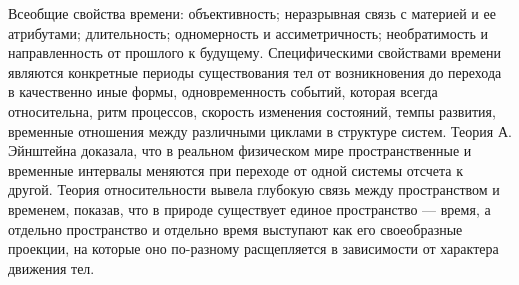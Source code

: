 \documentclass[12pt]{article}
\begin{document}
Всеобщие свойства времени: объективность; неразрывная связь с материей и ее атрибутами; длительность;
одномерность и ассиметричность; необратимость и направленность от прошлого к будущему.
Специфическими свойствами времени являются конкретные периоды существования тел от возникновения до
перехода в качественно иные формы, одновременность событий, которая всегда относительна, ритм процессов,
скорость изменения состояний, темпы развития, временные отношения между различными циклами в структуре
систем.
Теория А. Эйнштейна доказала, что в реальном физическом мире пространственные и временные интервалы
меняются при переходе от одной системы отсчета к другой.
Теория относительности вывела глубокую связь между пространством и временем, показав, что в природе
существует единое  пространство --- время, а  отдельно  пространство и отдельно  время выступают  как  его
своеобразные проекции, на которые оно по-разному расщепляется в зависимости от характера движения тел. 

\newpage
\end{document}
